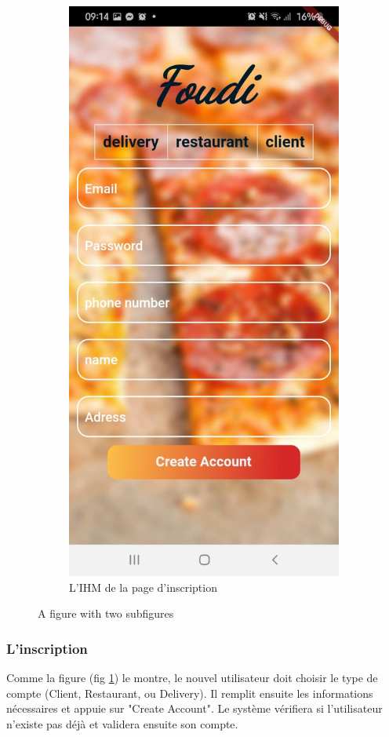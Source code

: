 \documentclass[french, a4paper, 12pt]{report}
\begin{document}
\begin{figure}[h!]
\begin{subfigure}{.5\textwidth}
  \centering
  \includegraphics[width=.9\linewidth]{screenshots/signup.jpg}
  \caption{L'IHM de la page d'inscription}
  \label{fig:signup}
\end{subfigure}
\caption{A figure with two subfigures}
\label{fig:lanc}
\end{figure}
		
		\subsubsection{L'inscription} Comme la figure (fig \ref{fig:signup}) le montre, le nouvel utilisateur doit choisir le type de compte (Client, Restaurant, ou Delivery). Il remplit ensuite les informations nécessaires et appuie sur "Create Account".
Le système vérifiera si l'utilisateur n'existe pas déjà et validera ensuite son compte.	
\end{document}
